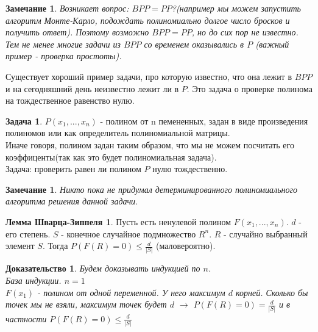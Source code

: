 \documentclass{beamer}
\theoremstyle{plain}
\newtheorem{rmk}[thm]{Замечание}
\newtheorem{proof-rus}[thm]{Доказательство}
\theoremstyle{definition}
\newtheorem{prob-rus}[thm]{Задача}
\newtheorem{lsz}[thm]{Лемма Шварца-Зиппеля}
\begin{document}
\begin{frame}
    \begin{rmk}
        Возникает вопрос: $BPP = PP$?(например мы можем запустить алгоритм Монте-Карло, подождать полиномиально долгое число бросков и получить ответ). Поэтому возможно $BPP = PP$, но до сих пор не известно. Тем не менее многие задачи из $BPP$ со временем оказывались в $P$ (важный пример - проверка простоты).
    \end{rmk}
    Существует хороший пример задачи, про которую известно, что она лежит в $BPP$ и на сегодняшний день неизвестно лежит ли в $P$. Это задача о проверке полинома на тождественное равенство нулю.
\end{frame}

\begin{frame}
    \begin{prob-rus}
        $P(x_1, ..., x_n)$ - полином от n пемененных, задан в виде произведения полиномов или как определитель полиномиальной матрицы. \\
        Иначе говоря, полином задан таким образом, что мы не можем посчитать его коэффиценты(так как это будет полиномиальная задача). \\
        Задача: проверить равен ли полином $P$ нулю тождественно.
    \end{prob-rus}
    \begin{rmk}
        Никто пока не придумал детерминированного полиномиального алгоритма решения данной задачи.
    \end{rmk}
\end{frame}

\begin{frame}
    \begin{lsz}
        Пусть есть ненулевой полином $F(x_1, ..., x_n)$. $d$ - его степень. $S$ - конечное случайное подмножество $R^n$. $R$ - случайно выбранный элемент $S$. Тогда $P(F(R)=0) \leq \frac{d}{|S|}$ (маловероятно).
    \end{lsz}
    \begin{proof-rus}
        Будем доказывать индукцией по $n$. \\
        База индукции. $n=1$ \\
        $F(x_1)$ - полином от одной переменной. У него максимум $d$ корней. Сколько бы точек мы не взяли, максимум точек будет $d$ $\rightarrow$ $P(F(R)=0)=\frac{d}{|S|}$ и в частности $P(F(R)=0) \leq \frac{d}{|S|}$
        
    \end{proof-rus}
\end{frame}
\end{document}
